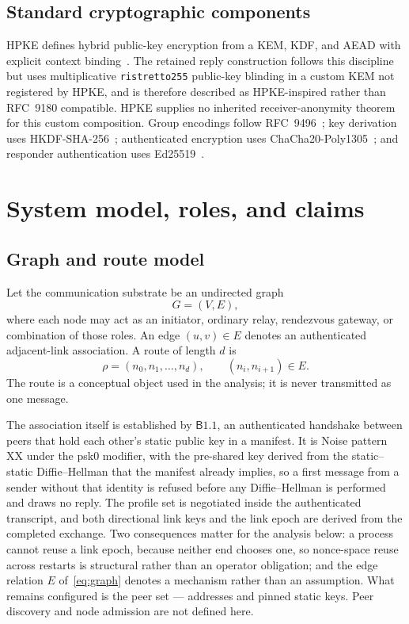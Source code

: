 \documentclass[11pt,oneside]{article}
\newcommand{\Bone}{\ensuremath{\mathsf{B1.1}}}
\newcommand{\code}[1]{\texttt{#1}}
\begin{document}
\subsection{Standard cryptographic components}

HPKE defines hybrid public-key encryption from a KEM, KDF, and AEAD with explicit context binding~\cite{hpke}. The retained reply construction follows this discipline but uses multiplicative \code{ristretto255} public-key blinding in a custom KEM not registered by HPKE, and is therefore described as HPKE-inspired rather than RFC~9180 compatible. HPKE supplies no inherited receiver-anonymity theorem for this custom composition. Group encodings follow RFC~9496~\cite{ristretto}; key derivation uses HKDF-SHA-256~\cite{hkdf}; authenticated encryption uses ChaCha20-Poly1305~\cite{chacha}; and responder authentication uses Ed25519~\cite{eddsa}.

\section{System model, roles, and claims}
\label{sec:model}

\subsection{Graph and route model}

Let the communication substrate be an undirected graph
\begin{equation}
G=(V,E),
\label{eq:graph}
\end{equation}
where each node may act as an initiator, ordinary relay, rendezvous gateway, or combination of those roles. An edge $(u,v)\in E$ denotes an authenticated adjacent-link association. A route of length $d$ is
\begin{equation}
\rho=(n_0,n_1,\ldots,n_d), \qquad (n_i,n_{i+1})\in E.
\label{eq:route}
\end{equation}
The route is a conceptual object used in the analysis; it is never transmitted as one message.

The association itself is established by \Bone{}, an authenticated handshake between peers that hold each other's static public key in a manifest. It is Noise pattern \textsf{XX} under the \textsf{psk0} modifier, with the pre-shared key derived from the static--static Diffie--Hellman that the manifest already implies, so a first message from a sender without that identity is refused before any Diffie--Hellman is performed and draws no reply. The profile set is negotiated inside the authenticated transcript, and both directional link keys and the link epoch are derived from the completed exchange. Two consequences matter for the analysis below: a process cannot reuse a link epoch, because neither end chooses one, so nonce-space reuse across restarts is structural rather than an operator obligation; and the edge relation $E$ of~\eqref{eq:graph} denotes a mechanism rather than an assumption. What remains configured is the peer set --- addresses and pinned static keys. Peer discovery and node admission are not defined here.
\end{document}
